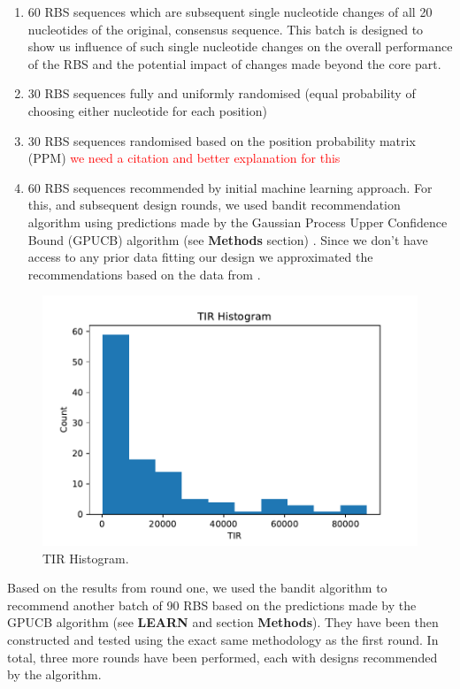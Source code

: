 \documentclass{article}
\begin{document}
\begin{enumerate}
    \item 60 RBS sequences which are subsequent single nucleotide changes of all 20 nucleotides of the original, consensus sequence. This batch is designed to show us influence of such single nucleotide changes on the overall performance of the RBS and the potential impact of changes made beyond the core part.
    \item 30 RBS sequences fully and uniformly randomised (equal probability of choosing either nucleotide for each position) 
    \item 30 RBS sequences randomised based on the position probability matrix (PPM) \textcolor{red}{we need a citation and better explanation for this}  
    \item 60 RBS sequences recommended by initial machine learning approach. For this, and subsequent design rounds, we used bandit recommendation algorithm using predictions made by the Gaussian Process Upper Confidence Bound (GPUCB) algorithm (see \textbf{Methods} section) \cite{srinivas2012information}. Since we don't have access to any prior data fitting our design we approximated the recommendations based on the data from \textcite{jervis2018machine}. 
\end{enumerate}{}

\begin{figure}[t]
    \centering
    \includegraphics[scale=0.7]{plots/TIR_histogram.pdf}
    \caption{TIR Histogram.}
    \label{fig: TIR Histogram.}
\end{figure}

Based on the results from round one, we used the bandit algorithm to recommend another batch of 90 RBS based on the predictions made by the GPUCB algorithm (see \textbf{LEARN} and section \textbf{Methods}). They have been then constructed and tested using the exact same methodology as the first round. In total, three more rounds have been performed, each with designs recommended by the algorithm. 
\end{document}
